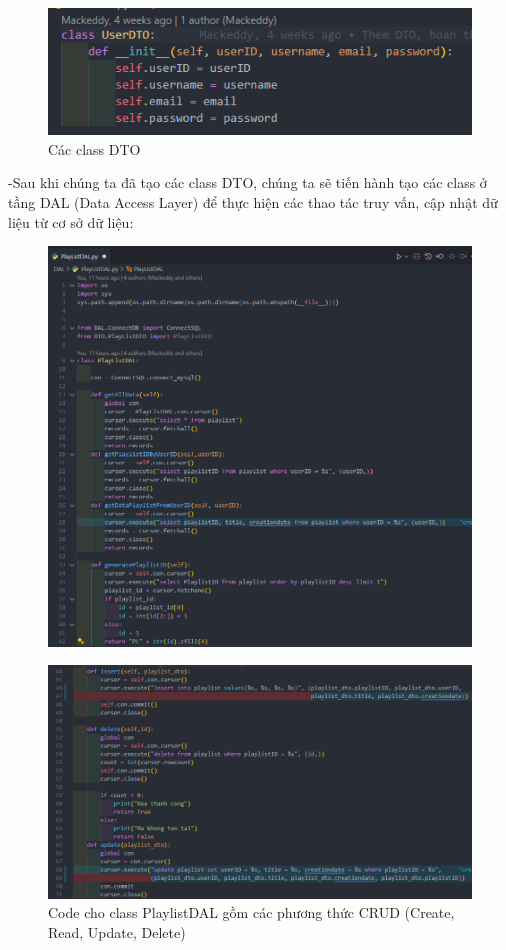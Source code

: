 \documentclass[a4paper]{article}
\begin{document}
\newpage
\begin{flushleft}
	\begin{figure}[h]
		\includegraphics[width=\textwidth]{images/UserDTO.png}
		\caption{Các class DTO}
	\end{figure}
	-Sau khi chúng ta đã tạo các class DTO, chúng ta sẽ tiến hành tạo các class ở tầng DAL (Data Access Layer) để thực hiện các thao tác truy vấn, cập nhật dữ liệu từ cơ sở dữ liệu:
\end{flushleft}
\begin{figure}[h]
	\centering
	\includegraphics[width=\textwidth]{images/PlaylistDAL-1.png}
\end{figure}
\clearpage

\newpage
\begin{figure}
	\includegraphics[width=\textwidth]{images/PlaylistDAL-2.png}
	\caption{Code cho class PlaylistDAL gồm các phương thức CRUD (Create, Read, Update, Delete)}
\end{figure}
\end{document}
